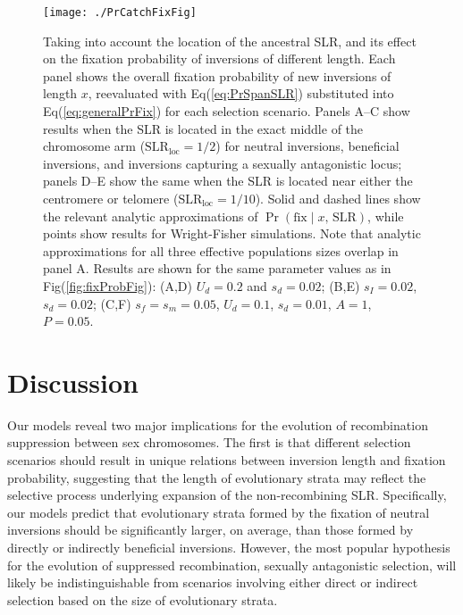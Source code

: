 \documentclass{article}[12pt]
\begin{document}



 \begin{figure}[htbp]
 \centering
 \texttt{[image: ./PrCatchFixFig]}
 \caption{Taking into account the location of the ancestral SLR, and its effect on the fixation probability of inversions of different length. Each panel shows the overall fixation probability of new inversions of length $x$, reevaluated with Eq(\ref{eq:PrSpanSLR}) substituted into Eq(\ref{eq:generalPrFix}) for each selection scenario. Panels A--C show results when the SLR is located in the exact middle of the chromosome arm ($\text{SLR}_\text{loc} = 1/2$) for neutral inversions, beneficial inversions, and inversions capturing a sexually antagonistic locus; panels D--E show the same when the SLR is located near either the centromere or telomere ($\text{SLR}_\text{loc} = 1/10$). Solid and dashed lines show the relevant analytic approximations of $\Pr(\text{fix} \mid x,\, \text{SLR})$, while points show results for Wright-Fisher simulations. Note that analytic approximations for all three effective populations sizes overlap in panel A. Results are shown for the same parameter values as in Fig(\ref{fig:fixProbFig}): (A,D) $U_d = 0.2$ and $s_d = 0.02$; (B,E) $s_I = 0.02$, $s_d = 0.02$; (C,F) $s_f = s_m = 0.05$, $U_d = 0.1$, $s_d = 0.01$, $A = 1$, $P = 0.05$.}
 \label{fig:probCatchFixFig}
 \end{figure}





\section*{Discussion} \label{sec:Discussion}

Our models reveal two major implications for the evolution of recombination suppression between sex chromosomes. The first is that different selection scenarios should result in unique relations between inversion length and fixation probability, suggesting that the length of evolutionary strata may reflect the selective process underlying expansion of the non-recombining SLR. Specifically, our models predict that evolutionary strata formed by the fixation of neutral inversions should be significantly larger, on average, than those formed by directly or indirectly beneficial inversions. However, the most popular hypothesis for the evolution of suppressed recombination, sexually antagonistic selection, will likely be indistinguishable from scenarios involving either direct or indirect selection based on the size of evolutionary strata.
\end{document}
